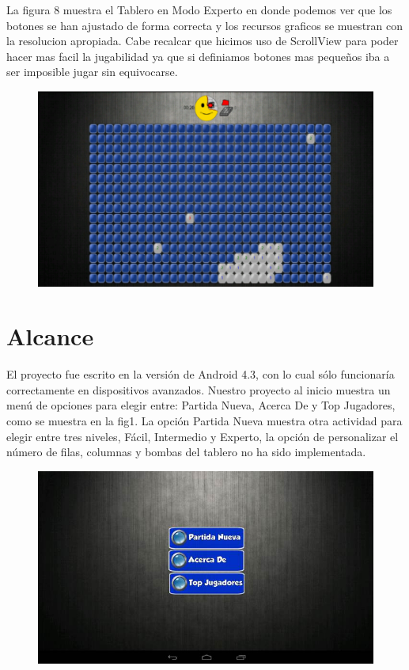 \documentclass[11pt]{article} %
\begin{document}
La figura 8 muestra el Tablero en Modo Experto en donde podemos ver que los botones se han ajustado de forma correcta y los recursos graficos se muestran con la resolucion apropiada. Cabe recalcar que hicimos uso de ScrollView para poder hacer mas facil la jugabilidad ya que si definiamos  botones mas pequeños iba a ser imposible jugar sin equivocarse.

\begin{figure}[H]
 \begin{center}
    \includegraphics{imagenes_Documentacion/AvanceCinco}
\end{center}
\caption {}
\label{Avance Cinco}
\end{figure}



\section{Alcance}

El proyecto fue escrito en la versión de Android 4.3, con lo cual sólo funcionaría correctamente en dispositivos avanzados.
Nuestro proyecto al inicio  muestra un menú de opciones para elegir entre: Partida Nueva, Acerca De y Top Jugadores, como se muestra en la fig1. La opción Partida Nueva muestra otra actividad para elegir entre tres niveles, Fácil, Intermedio y Experto, la opción de personalizar el número de filas, columnas y bombas del tablero no ha sido implementada. 

\begin{figure}[H]
 \begin{center}
    \includegraphics{imagenes_Documentacion/fig1}
\end{center}
\caption {}
\label{Figura 1}
\end{figure}
\end{document}
